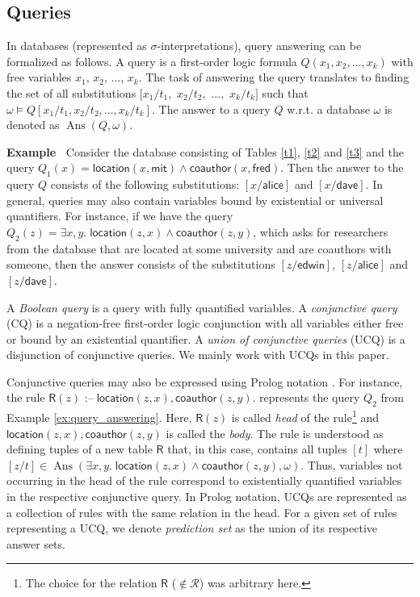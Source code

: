 \documentclass[akbc,twoside,11pt]{article}
\newcounter{example}
\newenvironment{example}[1][]{\refstepcounter{example}\par\medskip\noindent
   \textbf{Example~\theexample #1} \rmfamily}{\medskip}
\begin{document}
\subsection{Queries} \label{queries}

In databases (represented as $\sigma$-interpretations), query answering can be formalized as follows. A query is a first-order logic formula $Q(x_1,x_2,\dots, x_k)$ with free variables $x_1$, $x_2$, $\dots$, $x_k$. The task of answering the query translates to finding the set of all substitutions $[x_1/t_1,$ $x_2/t_2,$ $\dots,$ $x_k/t_k]$ such that $\omega \models Q[x_1/t_1,x_2/t_2,\dots,x_k/t_k]$. The answer to a query $Q$ w.r.t. a database $\omega$ is denoted as $\operatorname{Ans}(Q,\omega)$.

\begin{example}\label{ex:query_answering}
Consider the database consisting of Tables \ref{t1}, \ref{t2} and \ref{t3} and the query 
$Q_1(x) = \mathsf{location}(x, \mathsf{mit}) \wedge \mathsf{coauthor}(x, \mathsf{fred})$. Then the answer to the query $Q$ consists of the following substitutions: $[x/\mathsf{alice}]$ and $[x/\mathsf{dave}]$. In general, queries may also contain variables bound by existential or universal quantifiers. For instance, if we have the query
$Q_2(z) = \exists x, y .\; \mathsf{location}(z, x) \wedge \mathsf{coauthor}(z, y) $, which asks for researchers from the database that are located at some university and are coauthors with someone, then the answer consists of the substitutions $[z/\mathsf{edwin}]$, $[z/\mathsf{alice}]$ and $[z/\mathsf{dave}]$.
\end{example}

A {\em Boolean query} is a query with fully quantified variables. A {\em conjunctive query} (CQ) is a negation-free first-order logic conjunction with all variables either free or bound by an existential quantifier. A {\em union of conjunctive queries} (UCQ) is a disjunction of conjunctive queries. We mainly work with UCQs in this paper. 

Conjunctive queries may also be expressed using Prolog notation \cite{DBLP:books/sp/ClocksinM81}. For instance, the rule $\mathsf{R}(z) \mbox{ :--}\; \mathsf{location}(z,x), \mathsf{coauthor}(z,y).$ represents the query $Q_2$ from Example \ref{ex:query_answering}. 
 Here, $\mathsf{R}(z)$ is called {\em head} of the rule\footnote{The choice for the relation $\mathsf{R}$ ($\notin \mathcal{R}$) was arbitrary here.} and $\mathsf{location}(z,x), \mathsf{coauthor}(z,y)$ is called the {\em body}. The rule is understood as defining tuples of a new table $\mathsf{R}$ that, in this case, contains all tuples $[t]$ where $[z/t] \in \operatorname{Ans}(\exists x, y.\; \mathsf{location}(z,x) \wedge \mathsf{coauthor}(z,y), \omega)$. Thus, variables not occurring in the head of the rule correspond to existentially quantified variables in the respective conjunctive query. In Prolog notation, UCQs are represented as a collection of rules with the same relation in the head. For a given set of rules representing a UCQ, we denote {\em prediction set} as the union of its respective answer sets.
\end{document}
